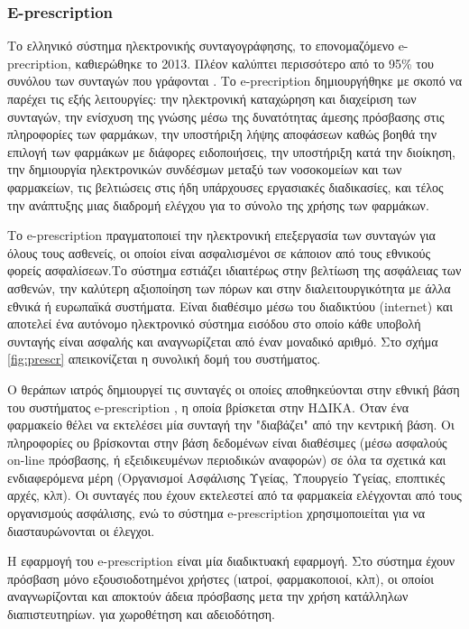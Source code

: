 	\subsubsection{E-prescription }
	
		Το ελληνικό σύστημα ηλεκτρονικής συνταγογράφησης,  το επονομαζόμενο e-precription, καθιερώθηκε το 2013. Πλέον καλύπτει περισσότερο  από το 95\% του συνόλου των συνταγών που γράφονται . Το e-precription δημιουργήθηκε με σκοπό να παρέχει τις εξής λειτουργίες: την ηλεκτρονική καταχώρηση και διαχείριση των συνταγών, την ενίσχυση της γνώσης μέσω της δυνατότητας άμεσης πρόσβασης στις πληροφορίες των φαρμάκων, την υποστήριξη λήψης αποφάσεων καθώς βοηθά την επιλογή των φαρμάκων με διάφορες ειδοποιήσεις, την υποστήριξη κατά την διοίκηση, την δημιουργία ηλεκτρονικών συνδέσμων μεταξύ των νοσοκομείων και των φαρμακείων, τις βελτιώσεις στις ήδη υπάρχουσες εργασιακές διαδικασίες, και τέλος την ανάπτυξης μιας διαδρομή ελέγχου για το σύνολο της χρήσης των φαρμάκων.  \cite{miller}
		
		Το e-prescription πραγματοποιεί την ηλεκτρονική επεξεργασία των συνταγών για όλους τους ασθενείς, οι οποίοι είναι ασφαλισμένοι σε κάποιον από τους εθνικούς φορείς ασφαλίσεων.Το σύστημα εστιάζει ιδιαιτέρως στην βελτίωση της ασφάλειας των ασθενών, την καλύτερη αξιοποίηση των πόρων και στην διαλειτουργικότητα με άλλα εθνικά ή ευρωπαϊκά συστήματα. Είναι διαθέσιμο μέσω του διαδικτύου (internet) και αποτελεί ένα αυτόνομο ηλεκτρονικό σύστημα εισόδου στο οποίο κάθε υποβολή συνταγής είναι ασφαλής και αναγνωρίζεται από έναν μοναδικό αριθμό. Στο σχήμα \ref{fig:prescr} απεικονίζεται η συνολική δομή του συστήματος. \cite{pangalos}
		
		Ο θεράπων ιατρός δημιουργεί τις συνταγές οι οποίες αποθηκεύονται στην εθνική βάση του συστήματος e-prescription , η οποία βρίσκεται στην ΗΔΙΚΑ. \cite{idika}Όταν ένα φαρμακείο θέλει να εκτελέσει μία συνταγή την  "διαβάζει" από την κεντρική βάση. Οι πληροφορίες ου βρίσκονται στην βάση δεδομένων είναι διαθέσιμες (μέσω ασφαλούς on-line πρόσβασης, ή εξειδικευμένων περιοδικών αναφορών) σε όλα τα σχετικά και ενδιαφερόμενα μέρη (Οργανισμοί Ασφάλισης Υγείας, Υπουργείο Υγείας, εποπτικές αρχές, κλπ). Οι συνταγές που έχουν εκτελεστεί από τα φαρμακεία  ελέγχονται από τους οργανισμούς ασφάλισης, ενώ το σύστημα e-prescription χρησιμοποιείται για να διασταυρώνονται οι έλεγχοι. \cite{papala}

	Η εφαρμογή του e-prescription είναι μία διαδικτυακή εφαρμογή. Στο σύστημα έχουν πρόσβαση μόνο εξουσιοδοτημένοι χρήστες (ιατροί, φαρμακοποιοί, κλπ), οι οποίοι αναγνωρίζονται και αποκτούν άδεια πρόσβασης μετα την χρήση κατάλληλων διαπιστευτηρίων. για χωροθέτηση και αδειοδότηση.
	
